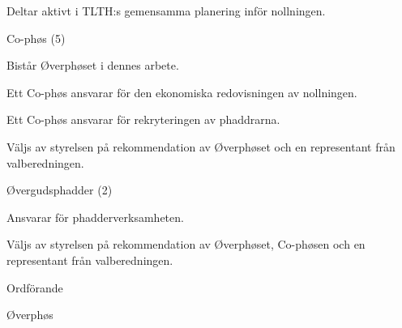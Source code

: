 \documentclass[../_main/handlingar.tex]{subfiles}
\begin{document}
\begin{attsatser}
\begin{emptylist}
\begin{dashlist}
                \item Deltar aktivt i TLTH:s gemensamma planering inför nollningen.
            \end{dashlist}
        \item Co-phøs (5)
            \begin{dashlist}
                \item Bistår Øverphøset i dennes arbete.
                \item Ett Co-phøs ansvarar för den ekonomiska redovisningen av nollningen.
                \item Ett Co-phøs ansvarar för rekryteringen av phaddrarna.
                \item Väljs av styrelsen på rekommendation av Øverphøset och en representant från valberedningen.
            \end{dashlist}
        \item Øvergudsphadder (2)
            \begin{dashlist}
                \item Ansvarar för phadderverksamheten.
                \item Väljs av styrelsen på rekommendation av Øverphøset, Co-phøsen och en representant från valberedningen.
            \end{dashlist}
    \end{emptylist}
\end{attsatser}

\begin{signatures}{2}
    \ist
    \signature{\ordf}{Ordförande}
    \signature{Niklas Gustafson}{Øverphøs}
\end{signatures}
\end{document}
